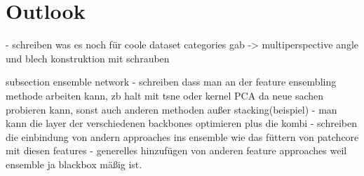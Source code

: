 \section{Outlook}
\label{sec:outlook}


- schreiben was es noch für coole dataset categories gab -> multiperspective angle und blech konstruktion mit schrauben

subsection ensemble network
- schreiben dass man an der feature ensembling methode arbeiten kann, zb halt mit tsne oder kernel PCA da neue sachen probieren kann, sonst auch anderen methoden außer stacking(beispiel)
- man kann die layer der verschiedenen backbones optimieren plus die kombi
- schreiben die einbindung von andern approaches ins ensemble wie das füttern von patchcore mit diesen features
- generelles hinzufügen von anderen feature approaches weil ensemble ja blackbox mäßig ist.



